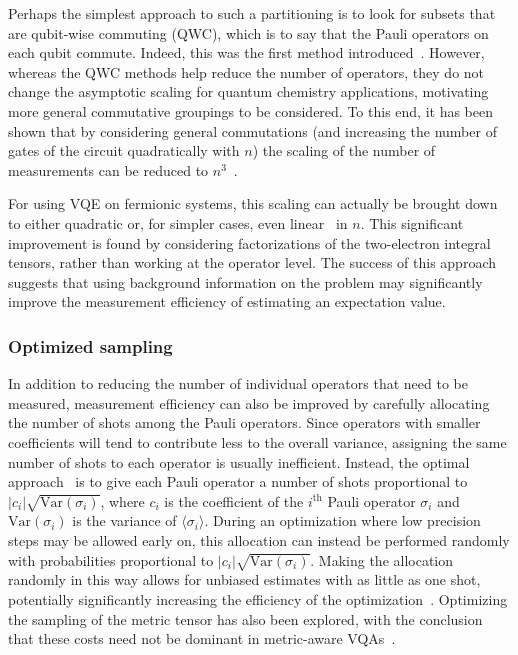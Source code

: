 \documentclass[prx,twocolumn,floatfix,superscriptaddress,longbibliography]{revtex4-1}
\newcommand{\<}{\langle}
\renewcommand{\>}{\rangle}
\begin{document}
Perhaps the simplest approach to such a partitioning is to look for subsets that are qubit-wise commuting (QWC), which is to say that the Pauli operators on each qubit commute. Indeed, this was the first method introduced~\cite{mcclean2016theory}. 
However, whereas the QWC methods help reduce the number of operators, they do not change the asymptotic scaling for quantum chemistry applications, motivating more general commutative groupings to be considered. To this end, it has been shown that by considering general commutations (and increasing the number of gates of the circuit quadratically with $n$) the scaling of the number of measurements can be reduced to $n^3$~\cite{Jena2019,zhao2020measurement,Crawford2019,Izmaylov2019,Yen2019,Gokhale2019-2}. 

For using VQE on fermionic systems, this scaling can actually be brought down to either quadratic or,  for simpler cases, even linear~\cite{huggins2019efficient} in $n$. This significant improvement is found by considering  factorizations of the two-electron integral tensors, rather than working at the operator level. The success of this approach suggests that using background information on the problem  may significantly improve the measurement efficiency of estimating an expectation value.

\subsubsection{ Optimized sampling} In addition to reducing the number of individual operators that need to be measured, measurement efficiency can also be improved by carefully allocating the number of shots among the Pauli operators. Since operators with smaller coefficients will tend to contribute less to the overall variance, assigning the same number of shots to each operator is usually inefficient. Instead, the optimal approach~\cite{rubin2018application} is to give each Pauli operator a number of shots proportional to $|c_i| \sqrt{\text{Var}(\sigma_i)}$, where $c_i$ is the coefficient of the $i^\text{th}$ Pauli operator $\sigma_i$ and $\text{Var}(\sigma_i)$ is the variance of $\langle\sigma_i\rangle$. During an optimization where low precision steps may be allowed early on, this allocation can instead be performed randomly with probabilities proportional to $|c_i| \sqrt{\text{Var}(\sigma_i)}$. Making the allocation randomly in this way allows for unbiased estimates with as little as one shot, potentially significantly increasing the efficiency of the optimization~\cite{arrasmith2020operator}. Optimizing the sampling of the metric tensor has also been explored, with the conclusion that these costs need not be dominant in metric-aware VQAs~\cite{vanStraaten2020metricaware}.
\end{document}

